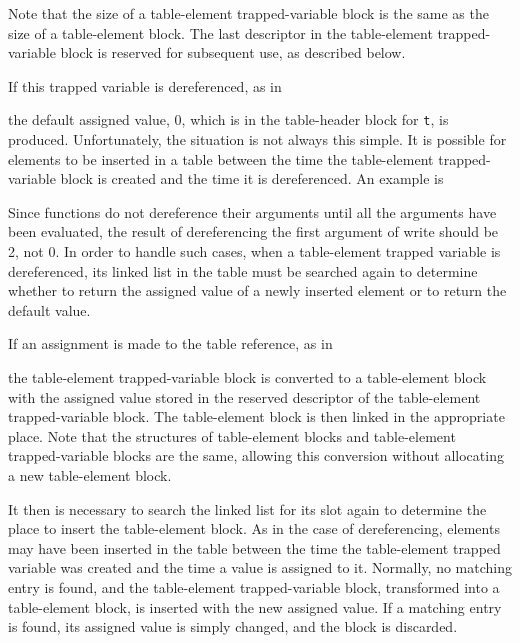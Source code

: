Note that the size of a table-element trapped-variable block is the
same as the size of a table-element block. The last descriptor in the
table-element trapped-variable block is reserved for subsequent use,
as described below.

If this trapped variable is dereferenced, as in


\noindent the default assigned value, 0, which is in the table-header
block for \texttt{t}, is produced. Unfortunately, the situation is not
always this simple. It is possible for elements to be inserted in a
table between the time the table-element trapped-variable block is
created and the time it is dereferenced. An example is


Since functions do not dereference their arguments until all the
arguments have been evaluated, the result of dereferencing the first
argument of write should be 2, not 0. In order to handle such cases,
when a table-element trapped variable is dereferenced, its linked list
in the table must be searched again to determine whether to return the
assigned value of a newly inserted element or to return the default
value.

If an assignment is made to the table reference, as in


\noindent the table-element trapped-variable block is converted to a
table-element block with the assigned value stored in the reserved
descriptor of the table-element trapped-variable block. The
table-element block is then linked in the appropriate place. Note that
the structures of table-element blocks and table-element
trapped-variable blocks are the same, allowing this conversion without
allocating a new table-element block.

It then is necessary to search the linked list for its slot again to
determine the place to insert the table-element block. As in the case
of dereferencing, elements may have been inserted in the table between
the time the table-element trapped variable was created and the time a
value is assigned to it. Normally, no matching entry is found, and the
table-element trapped-variable block, transformed into a table-element
block, is inserted with the new assigned value.  If a matching entry
is found, its assigned value is simply changed, and the block is
discarded.

